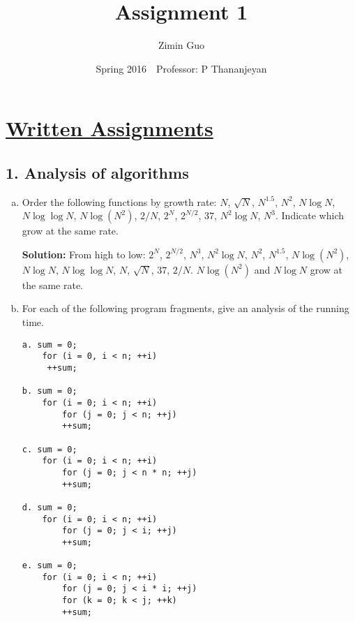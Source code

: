 \documentclass{article}\usepackage{amsmath,amssymb,amsthm,tikz,tkz-graph,color,chngpage,soul,hyperref,csquotes,graphicx,floatrow}\newcommand*{\QEDB}{\hfill\ensuremath{\square}}\newtheorem*{prop}{Proposition}\renewcommand{\theenumi}{\alph{enumi}}\usepackage[shortlabels]{enumitem}\usepackage[nobreak=true]{mdframed}\usetikzlibrary{matrix,calc}\MakeOuterQuote{"}\usepackage[margin=0.75in]{geometry} \newtheorem{theorem}{Theorem}
\title{Assignment 1}
\author{Zimin Guo}
\date{Spring 2016$\quad$Professor: P Thananjeyan }
\begin{document}
\maketitle

\section*{\underline{Written Assignments}}

\subsection*{1. Analysis of algorithms}
\begin{enumerate}[(a)]
\item Order the following functions by growth rate: $N$, $\sqrt{N}$, $N^{1.5}$, $N^2$, $N\log N$, $N\log \log N$, $N\log{(N^2)}$, $2/N$, $2^N$, $2^{N/2}$, $37$, $N^2\log N$, $N^3$. Indicate which grow at the same rate.
\begin{mdframed}
\textbf{Solution:}
From high to low: $2^N$, $2^{N/2}$, $N^3$,  $N^2\log N$,  $N^2$, $N^{1.5}$, $N\log{(N^2)}$, $N\log N$, $N\log \log N$, $N$, $\sqrt{N}$, $37$, $2/N$. $N\log{(N^2)}$ and $N\log N$ grow at the same rate.
\end{mdframed}
\item For each of the following program fragments, give an analysis of the running time.
\begin{center}
\begin{BVerbatim}
a. sum = 0;
    for (i = 0, i < n; ++i)
	 ++sum;
	
b. sum = 0;
    for (i = 0; i < n; ++i)
    	for (j = 0; j < n; ++j)
		++sum;
		
c. sum = 0;
    for (i = 0; i < n; ++i)
    	for (j = 0; j < n * n; ++j)
		++sum;
		
d. sum = 0;
    for (i = 0; i < n; ++i)
    	for (j = 0; j < i; ++j)
		++sum;
		
e. sum = 0;
    for (i = 0; i < n; ++i)
    	for (j = 0; j < i * i; ++j)
		for (k = 0; k < j; ++k)
		++sum; 


\end{BVerbatim}
\end{center}
\end{enumerate}
\end{document}
